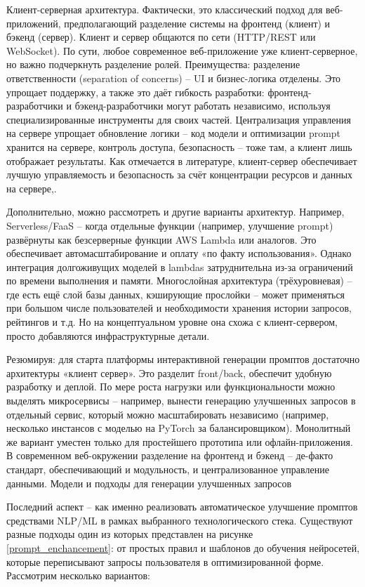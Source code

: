 Клиент-серверная архитектура. Фактически, это классический подход для веб-приложений, предполагающий разделение системы на фронтенд (клиент) и бэкенд (сервер). Клиент и сервер общаются по сети (HTTP/REST или WebSocket). По сути, любое современное веб-приложение уже клиент-серверное, но важно подчеркнуть разделение ролей. Преимущества: разделение ответственности (separation of concerns) – UI и бизнес-логика отделены. Это упрощает поддержку, а также это даёт гибкость разработки: фронтенд-разработчики и бэкенд-разработчики могут работать независимо, используя специализированные инструменты для своих частей. Централизация управления на сервере упрощает обновление логики – код модели и оптимизации prompt хранится на сервере, контроль доступа, безопасность – тоже там, а клиент лишь отображает результаты. Как отмечается в литературе, клиент-сервер обеспечивает лучшую управляемость и безопасность за счёт концентрации ресурсов и данных на сервере\cite{kitrum:clientserver},\cite{enjoyalgorithms:clientserver}.


Дополнительно, можно рассмотреть и другие варианты архитектур. Например, Serverless/FaaS – когда отдельные функции (например, улучшение prompt) развёрнуты как безсерверные функции AWS Lambda или аналогов. Это обеспечивает автомасштабирование и оплату «по факту использования». Однако интеграция долгоживущих моделей в lambdas затруднительна из-за ограничений по времени выполнения и памяти. Многослойная архитектура (трёхуровневая) – где есть ещё слой базы данных, кэширующие прослойки – может применяться при большом числе пользователей и необходимости хранения истории запросов, рейтингов и т.д. Но на концептуальном уровне она схожа с клиент-сервером, просто добавляются инфраструктурные детали.

Резюмируя: для старта платформы интерактивной генерации промптов достаточно архитектуры «клиент сервер». Это разделит front/back, обеспечит удобную разработку и деплой. По мере роста нагрузки или функциональности можно выделять микросервисы – например, вынести генерацию улучшенных запросов в отдельный сервис, который можно масштабировать независимо (например, несколько инстансов с моделью на PyTorch за балансировщиком). Монолитный же вариант уместен только для простейшего прототипа или офлайн-приложения. В современном веб-окружении разделение на фронтенд и бэкенд – де-факто стандарт, обеспечивающий и модульность, и централизованное управление данными\cite{enjoyalgorithms:clientserver}. Модели и подходы для генерации улучшенных запросов

Последний аспект – как именно реализовать автоматическое улучшение промптов средствами NLP/ML в рамках выбранного технологического стека. Существуют разные подходы один из которых представлен на рисунке \ref{prompt_enchancement}: от простых правил и шаблонов до обучения нейросетей, которые переписывают запросы пользователя в оптимизированной форме. Рассмотрим несколько вариантов:

